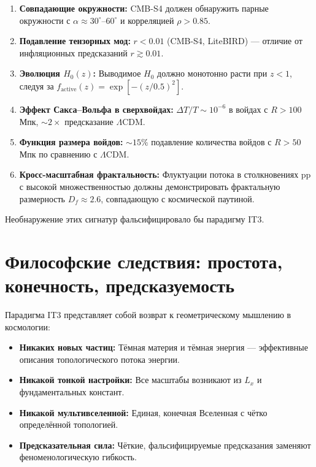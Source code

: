 \documentclass[12pt,a4paper]{article}
\begin{document}
\begin{enumerate}
    \item \textbf{Совпадающие окружности:} CMB-S4 должен обнаружить парные окружности с $\alpha \approx 30^\circ\text{--}60^\circ$ и корреляцией $\rho > 0.85$.
    
    \item \textbf{Подавление тензорных мод:} $r < 0.01$ (CMB-S4, LiteBIRD) — отличие от инфляционных предсказаний $r \gtrsim 0.01$.
    
    \item \textbf{Эволюция $H_0(z)$:} Выводимое $H_0$ должно монотонно расти при $z < 1$, следуя за $f_{\mathrm{active}}(z) = \exp[-(z/0.5)^2]$.
    
    \item \textbf{Эффект Сакса–Вольфа в сверхвойдах:} $\Delta T/T \sim 10^{-6}$ в войдах с $R > 100$ Мпк, $\sim 2\times$ предсказание $\Lambda$CDM.
    
    \item \textbf{Функция размера войдов:} $\sim 15\%$ подавление количества войдов с $R > 50$ Мпк по сравнению с $\Lambda$CDM.
    
    \item \textbf{Кросс-масштабная фрактальность:} Флуктуации потока в столкновениях pp с высокой множественностью должны демонстрировать фрактальную размерность $D_f \approx 2.6$, совпадающую с космической паутиной.
\end{enumerate}

Необнаружение этих сигнатур фальсифицировало бы парадигму IT3.

\section{Философские следствия: простота, конечность, предсказуемость}

Парадигма IT3 представляет собой возврат к геометрическому мышлению в космологии:
\begin{itemize}
    \item \textbf{Никаких новых частиц:} Тёмная материя и тёмная энергия — эффективные описания топологического потока энергии.
    \item \textbf{Никакой тонкой настройки:} Все масштабы возникают из $L_x$ и фундаментальных констант.
    \item \textbf{Никакой мультивселенной:} Единая, конечная Вселенная с чётко определённой топологией.
    \item \textbf{Предсказательная сила:} Чёткие, фальсифицируемые предсказания заменяют феноменологическую гибкость.
\end{itemize}
\end{document}
